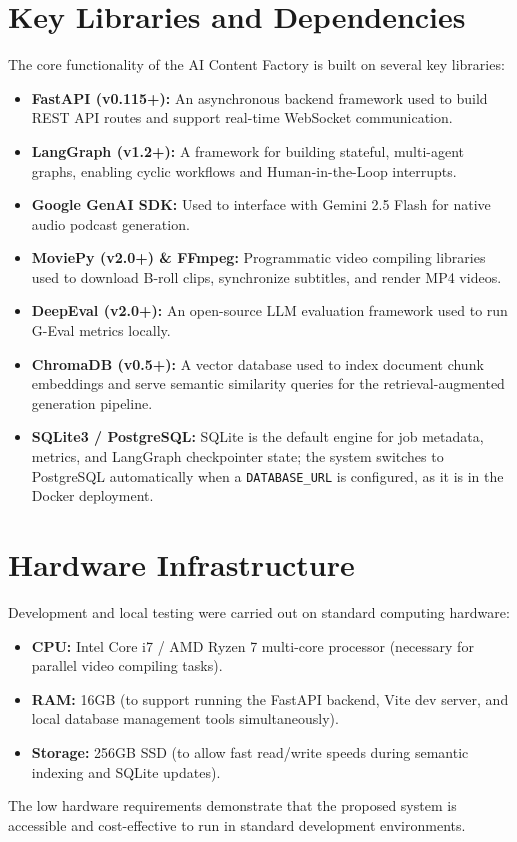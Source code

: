 \section{Key Libraries and Dependencies}

The core functionality of the AI Content Factory is built on several key libraries:
\begin{itemize}
    \item \textbf{FastAPI (v0.115+):} An asynchronous backend framework used to build REST API routes and support real-time WebSocket communication.
    \item \textbf{LangGraph (v1.2+):} A framework for building stateful, multi-agent graphs, enabling cyclic workflows and Human-in-the-Loop interrupts.
    \item \textbf{Google GenAI SDK:} Used to interface with Gemini 2.5 Flash for native audio podcast generation.
    \item \textbf{MoviePy (v2.0+) \& FFmpeg:} Programmatic video compiling libraries used to download B-roll clips, synchronize subtitles, and render MP4 videos.
    \item \textbf{DeepEval (v2.0+):} An open-source LLM evaluation framework used to run G-Eval metrics locally.
    \item \textbf{ChromaDB (v0.5+):} A vector database used to index document chunk embeddings and serve semantic similarity queries for the retrieval-augmented generation pipeline.
    \item \textbf{SQLite3 / PostgreSQL:} SQLite is the default engine for job metadata, metrics, and LangGraph checkpointer state; the system switches to PostgreSQL automatically when a \texttt{DATABASE\_URL} is configured, as it is in the Docker deployment.
\end{itemize}

\section{Hardware Infrastructure}

Development and local testing were carried out on standard computing hardware:
\begin{itemize}
    \item \textbf{CPU:} Intel Core i7 / AMD Ryzen 7 multi-core processor (necessary for parallel video compiling tasks).
    \item \textbf{RAM:} 16GB (to support running the FastAPI backend, Vite dev server, and local database management tools simultaneously).
    \item \textbf{Storage:} 256GB SSD (to allow fast read/write speeds during semantic indexing and SQLite updates).
\end{itemize}
The low hardware requirements demonstrate that the proposed system is accessible and cost-effective to run in standard development environments.


